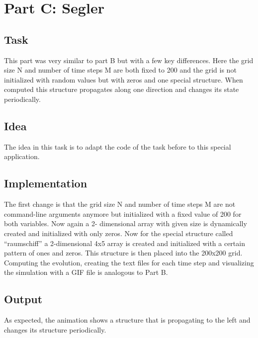 \documentclass[12pt,a4paper]{article}
\begin{document}
\newpage


\section{Part C: Segler}
\vspace{1cm}

\subsection{Task}
This part was very similar to part B but with a few key differences. Here the grid size N and
number of time steps M are both fixed to 200 and the grid is not initialized with random values
but with zeros and one special structure. When computed this structure propagates along one
direction and changes its state periodically.


\vspace{1cm}

\subsection{Idea}
The idea in this task is to adapt the code of the task before to this special application.


\vspace{1cm}

\subsection{Implementation}
The first change is that the grid size N and number of time steps M are not command-line
arguments anymore but initialized with a fixed value of 200 for both variables. Now again a 2-
dimensional array with given size is dynamically created and initialized with only zeros. Now for
the special structure called “raumschiff” a 2-dimensional 4x5 array is created and initialized
with a certain pattern of ones and zeros. This structure is then placed into the 200x200 grid.
Computing the evolution, creating the text files for each time step and visualizing the simulation
with a GIF file is analogous to Part B.


\newpage

\subsection{Output}
As expected, the animation shows a structure that is propagating to the left and changes its
structure periodically.
\end{document}
